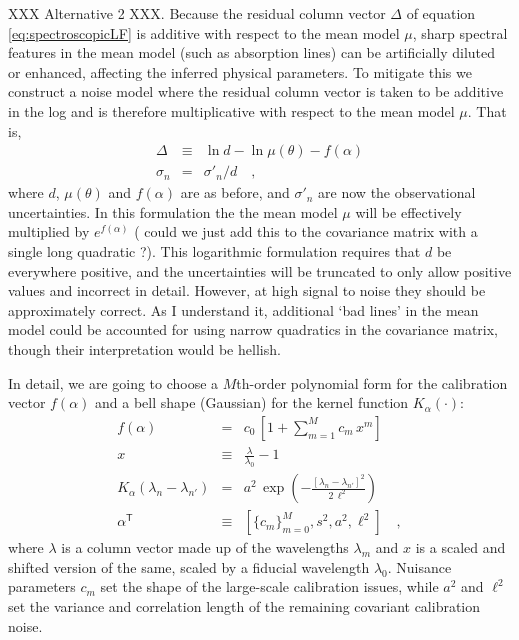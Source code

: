 \documentclass[iop,numberedappendix]{emulateapj}
\newcommand{\transpose}[1]{{#1}^{\!\mathsf T}}
\begin{document}
XXX Alternative 2 XXX.
Because the residual column vector $\Delta$ of equation
\ref{eq:spectroscopicLF} is additive with respect to the mean model
$\mu$, sharp spectral features in the mean model (such as absorption
lines) can be artificially diluted or enhanced, affecting the inferred
physical parameters. To mitigate this we construct a noise model where the
residual column vector is taken to be additive in the log and is
therefore multiplicative with respect to the mean model $\mu$.  That
is,
\begin{eqnarray}\label{eq:spectroscopicLFalt2} 
\Delta &\equiv&
\ln d - \ln \mu(\theta) - f(\alpha) \\
\sigma_{n} & = & \sigma'_n / d
\quad ,
\end{eqnarray}
where $d$, $\mu(\theta)$ and $f(\alpha)$ are as before, and
$\sigma'_{n}$ are now the observational uncertainties. In this
formulation the the mean model $\mu$ will be effectively multiplied by
$e ^{f(\alpha)}$ ({\color{red} could we just add
this to the covariance matrix with a single long quadratic ?}).  This
logarithmic formulation requires that $d$ be everywhere positive, and
the uncertainties will be truncated to only allow positive values and
incorrect in detail.  However, at high signal to noise they should be
approximately correct. {\color{red} As I understand it, additional
`bad lines' in the mean model could be accounted for using narrow
quadratics in the covariance matrix, though their interpretation would
be hellish.}

In detail, we are going to choose a $M$th-order polynomial form for
the calibration vector $f(\alpha)$ and a bell shape (Gaussian) for the
kernel function $K_\alpha(\cdot)$:
\begin{eqnarray}\displaystyle
f(\alpha) &=& c_0\,[1 + \sum_{m=1}^M c_m\,x^m]
\\
x &\equiv& \frac{\lambda}{\lambda_0} - 1
\\
K_\alpha(\lambda_n - \lambda_{n'}) &=& a^2\,\exp(-\frac{[\lambda_n - \lambda_{n'}]^2}{2\,\ell^2})
\\
\transpose{\alpha} &\equiv& \left[ \{c_m\}_{m=0}^M, s^2, a^2, \ell^2 \right]
\quad ,
\end{eqnarray}
where $\lambda$ is a column vector made up of the wavelengths $\lambda_m$
and $x$ is a scaled and shifted version of the same,
scaled by a fiducial wavelength $\lambda_0$.
Nuisance parameters $c_m$ set the shape of the large-scale calibration
issues, while $a^2$ and $\ell^2$ set the variance and correlation
length of the remaining covariant calibration noise.
\end{document}
